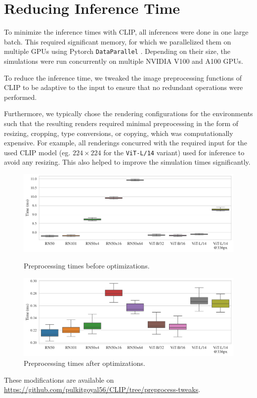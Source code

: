 \section{Reducing Inference Time}
\label{sec:improving-infer}
To minimize the inference times with CLIP, all inferences were done in one large batch.
This required significant memory, for which we parallelized them on multiple GPUs using Pytorch \texttt{DataParallel} \citep{pytorch}.
Depending on their size, the simulations were run concurrently on multiple NVIDIA V100 and A100 GPUs.

To reduce the inference time, we tweaked the image preprocessing functions of CLIP to be adaptive to the input to ensure that no redundant operations were performed.

Furthermore, we typically chose the rendering configurations for the environments such that the resulting renders required minimal preprocessing in the form of resizing, cropping, type conversions, or copying, which was computationally expensive.
For example, all renderings concurred with the required input for the used CLIP model (eg. \(224 \times 224\) for the \texttt{ViT-L/14} variant) used for inference to avoid any resizing.
This also helped to improve the simulation times significantly.\\

\begin{figure}[H]
    \centering
    \includegraphics[width=\textwidth]{images/full_transform.pdf}\vspace{-15pt}
    \caption{Preprocessing times before optimizations.}\vspace{15pt}
    \includegraphics[width=\textwidth]{images/fast_transform.pdf}\vspace{-15pt}
    \caption{Preprocessing times after optimizations.}
    \label{fig:preprocessing-time-improvement}
\end{figure}

These modifications are available on \url{https://github.com/pulkitgoyal56/CLIP/tree/preprocess-tweaks}.
